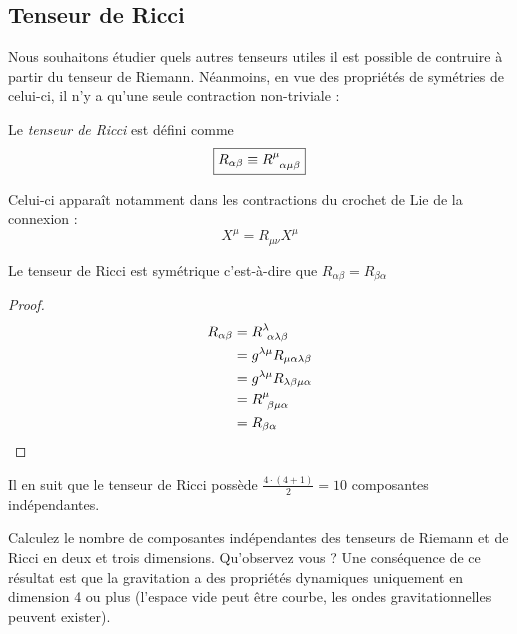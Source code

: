 \subsection{Tenseur de Ricci}
Nous souhaitons étudier quels autres tenseurs utiles il est possible de contruire à partir du tenseur de Riemann. Néanmoins, en vue des propriétés de symétries de celui-ci, il n'y a qu'une seule contraction non-triviale :
\begin{theoremframe}
    \begin{defi}
        Le \emph{tenseur de Ricci} est défini comme
        \begin{equation}
            \boxed{R_{\alpha \beta} \equiv R\indices{^{\mu}_{\alpha \mu \beta }}}
        \end{equation}
    \end{defi}
\end{theoremframe}
Celui-ci apparaît notamment dans les contractions du crochet de Lie de la connexion :
\begin{equation}
    [\nabla_\mu,\nabla_\nu] X^\mu = R_{\mu \nu} X^\mu
\end{equation}
\begin{theoremframe}
    \begin{propri}
        Le tenseur de Ricci est symétrique c'est-à-dire que $R_{\alpha \beta} = R_{\beta \alpha}$
    \end{propri}
\end{theoremframe}
\begin{proof}
    \begin{align}
        R_{\alpha \beta} &= R\indices{^{\lambda}_{\!\alpha \lambda \beta}}\\
        &= g^{\lambda \mu}R_{\mu \alpha \lambda \beta}\\
        &= g^{\lambda \mu}R_{ \lambda \beta \mu \alpha}\\
        &= R\indices{^{\mu}_{\!\beta \mu \alpha }}\\
        &= R_{\beta \alpha}
    \end{align}
\end{proof}
Il en suit que le tenseur de Ricci possède $\frac{4 \cdot (4+1)}{2} = 10$ composantes indépendantes.
\begin{exerc}
    Calculez le nombre de composantes indépendantes des tenseurs de Riemann et de Ricci en deux et trois dimensions. Qu'observez vous ? Une conséquence de ce résultat est que la gravitation a des propriétés dynamiques uniquement en dimension 4 ou plus (l'espace vide peut être courbe, les ondes gravitationnelles peuvent exister).
\end{exerc}
